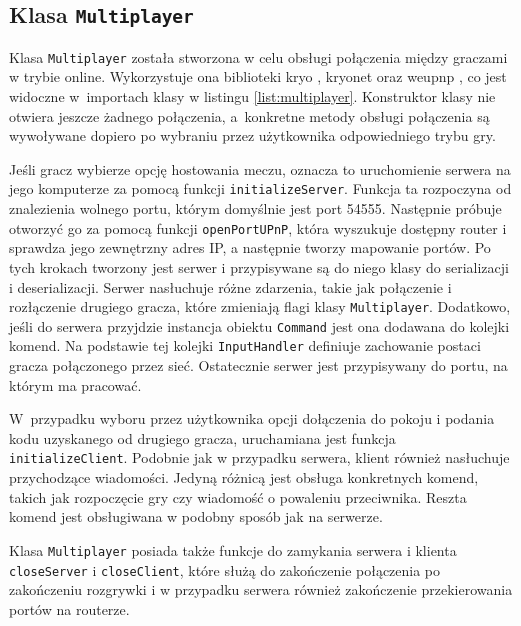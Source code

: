 \subsection{Klasa \texttt{Multiplayer}}
Klasa \texttt{Multiplayer} została stworzona w celu obsługi połączenia między graczami w trybie online. Wykorzystuje ona biblioteki kryo \cite{Kryo}, kryonet \cite{Kryonet} oraz weupnp \cite{weupnp}, co jest widoczne w~importach klasy w listingu \ref{list:multiplayer}. Konstruktor klasy nie otwiera jeszcze żadnego połączenia, a~konkretne metody obsługi połączenia są wywoływane dopiero po wybraniu przez użytkownika odpowiedniego trybu gry. 

Jeśli gracz wybierze opcję hostowania meczu, oznacza to uruchomienie serwera na jego komputerze za pomocą funkcji \texttt{initializeServer}. Funkcja ta rozpoczyna od znalezienia wolnego portu, którym domyślnie jest port 54555. Następnie próbuje otworzyć go za pomocą funkcji \texttt{openPortUPnP}, która wyszukuje dostępny router i sprawdza jego zewnętrzny adres IP, a następnie tworzy mapowanie portów. Po tych krokach tworzony jest serwer i przypisywane są do niego klasy do serializacji i deserializacji. Serwer nasłuchuje różne zdarzenia, takie jak połączenie i rozłączenie drugiego gracza, które zmieniają flagi klasy \texttt{Multiplayer}. Dodatkowo, jeśli do serwera przyjdzie instancja obiektu \texttt{Command} jest ona dodawana do kolejki komend. Na podstawie tej kolejki \texttt{InputHandler} definiuje zachowanie postaci gracza połączonego przez sieć. Ostatecznie serwer jest przypisywany do portu, na którym ma pracować. 

W~przypadku wyboru przez użytkownika opcji dołączenia do pokoju i podania kodu uzyskanego od drugiego gracza, uruchamiana jest funkcja \texttt{initializeClient}. Podobnie jak w przypadku serwera, klient również nasłuchuje przychodzące wiadomości. Jedyną różnicą jest obsługa konkretnych komend, takich jak rozpoczęcie gry czy wiadomość o powaleniu przeciwnika. Reszta komend jest obsługiwana w podobny sposób jak na serwerze. 

Klasa \texttt{Multiplayer} posiada także funkcje do zamykania serwera i klienta \texttt{closeServer} i \texttt{closeClient}, które służą do zakończenie połączenia po zakończeniu rozgrywki i w przypadku serwera również zakończenie przekierowania portów na routerze.

